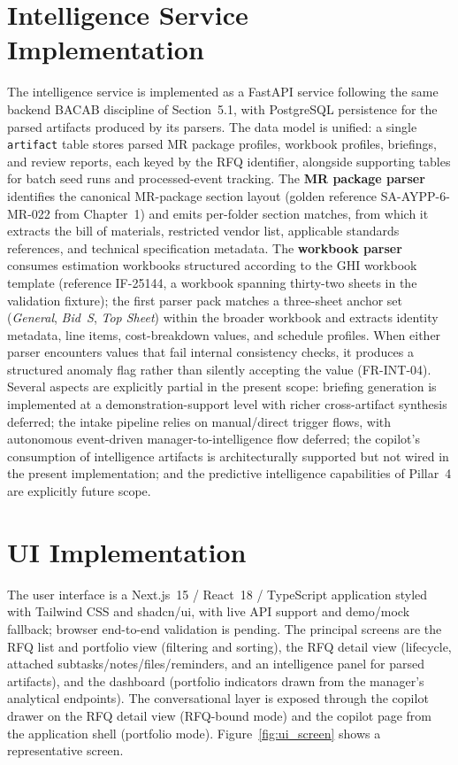 \section{Intelligence Service Implementation}
The intelligence service is implemented as a FastAPI service following the same backend BACAB discipline of Section~5.1, with PostgreSQL persistence for the parsed artifacts produced by its parsers. The data model is unified: a single \texttt{artifact} table stores parsed MR package profiles, workbook profiles, briefings, and review reports, each keyed by the RFQ identifier, alongside supporting tables for batch seed runs and processed-event tracking. The \textbf{MR package parser} identifies the canonical MR-package section layout (golden reference SA-AYPP-6-MR-022 from Chapter~1) and emits per-folder section matches, from which it extracts the bill of materials, restricted vendor list, applicable standards references, and technical specification metadata. The \textbf{workbook parser} consumes estimation workbooks structured according to the GHI workbook template (reference IF-25144, a workbook spanning thirty-two sheets in the validation fixture); the first parser pack matches a three-sheet anchor set (\textit{General}, \textit{Bid~S}, \textit{Top Sheet}) within the broader workbook and extracts identity metadata, line items, cost-breakdown values, and schedule profiles. When either parser encounters values that fail internal consistency checks, it produces a structured anomaly flag rather than silently accepting the value (FR-INT-04). Several aspects are explicitly partial in the present scope: briefing generation is implemented at a demonstration-support level with richer cross-artifact synthesis deferred; the intake pipeline relies on manual/direct trigger flows, with autonomous event-driven manager-to-intelligence flow deferred; the copilot's consumption of intelligence artifacts is architecturally supported but not wired in the present implementation; and the predictive intelligence capabilities of Pillar~4 are explicitly future scope.

\section{UI Implementation}
The user interface is a Next.js~15 / React~18 / TypeScript application styled with Tailwind CSS and shadcn/ui, with live API support and demo/mock fallback; browser end-to-end validation is pending. The principal screens are the RFQ list and portfolio view (filtering and sorting), the RFQ detail view (lifecycle, attached subtasks/notes/files/reminders, and an intelligence panel for parsed artifacts), and the dashboard (portfolio indicators drawn from the manager's analytical endpoints). The conversational layer is exposed through the copilot drawer on the RFQ detail view (RFQ-bound mode) and the copilot page from the application shell (portfolio mode). Figure~\ref{fig:ui_screen} shows a representative screen.

